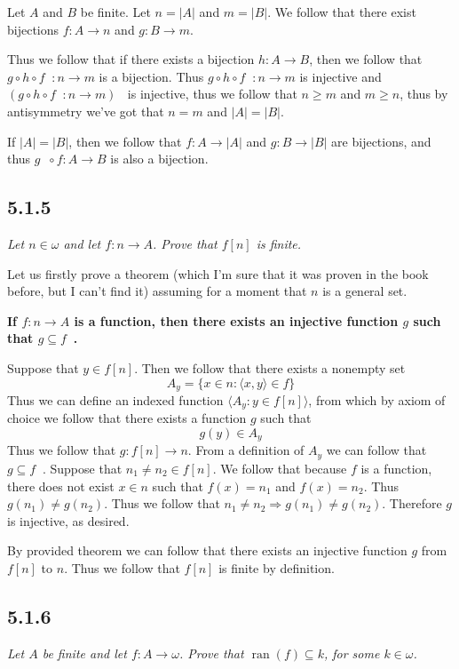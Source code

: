 \documentclass[11pt,oneside,titlepage]{book}
\DeclareMathOperator \inv {^{-1}}
\DeclareMathOperator \ra {\Rightarrow}
\DeclareMathOperator \ran {ran}
\newcommand{\eangle}[1]{\langle #1 \rangle}
\begin{document}
Let $A$ and $B$ be finite. Let $n = |A|$ and $m = |B|$. We follow that there exist bijections
$f: A \to n$ and $g: B \to m$.

Thus we follow that if there exists a bijection $h: A \to B$,
then we follow that $g \circ h \circ f \inv: n \to m$ is a bijection. Thus
$g \circ h \circ f \inv: n \to m$ is injective and
$(g \circ h \circ f \inv: n \to m)\inv$ is injective, thus we follow that $n \geq m$ and
$m \geq n$, thus by antisymmetry we've got that $n = m$ and $|A| = |B|$.

If $|A| = |B|$, then we follow that $f: A \to |A|$ and $g: B \to |B|$ are bijections,
and thus $g \inv \circ f: A \to B$ is also a bijection.

\subsection*{5.1.5}

\textit{Let $n \in \omega$ and let $f: n \to A$. Prove that $f[n]$ is finite.}

Let us firstly prove a theorem (which I'm sure that it was proven in the book before,
but I can't find it) assuming for a moment that $n$ is a general set.

\textbf{If $f: n \to A$ is a function, then there exists an injective function $g$
such that $g \subseteq f\inv$.}

Suppose that $y \in f[n]$. Then we follow that there exists a nonempty set
$$A_y = \{x \in n : \eangle{x, y} \in f\}$$
Thus we can define an indexed function $\eangle{A_y: y \in f[n]}$, from which by axiom of
choice we follow that there exists a function $g$ such that 
$$g(y) \in A_y$$
Thus we follow that $g: f[n] \to n$. From a definition of $A_y$ we can follow that
$g \subseteq f\inv$. Suppose that $n_1 \neq n_2 \in f[n]$. We follow that because $f$ is a
function, there does not exist $x \in n$ such that $f(x) = n_1$ and $f(x) = n_2$. Thus
$g(n_1) \neq g(n_2)$.
Thus we follow that $n_1 \neq n_2 \ra g(n_1) \neq g(n_2)$. Therefore $g$ is injective, as desired.

By provided theorem we can follow that there exists an injective function $g$ from $f[n]$ to $n$.
Thus we follow that $f[n]$ is finite by definition.

\subsection*{5.1.6}

\textit{Let $A$ be finite and let $f: A \to \omega$. Prove that $\ran(f) \subseteq k$, for
  some $k \in \omega$.}
\end{document}
